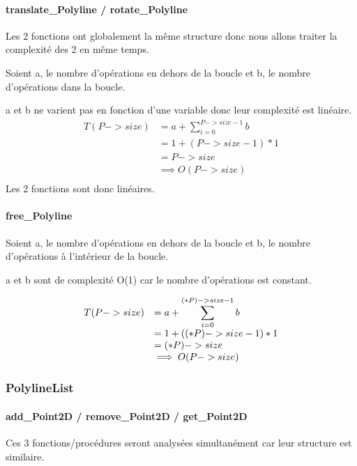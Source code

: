 \documentclass[a4paper, 11pt, oneside]{article}
\begin{document}
\paragraph{translate\_Polyline / rotate\_Polyline}

Les 2 fonctions ont globalement la même structure donc nous allons traiter la complexité des 2 en même temps.

Soient a, le nombre d'opérations en dehors de la boucle et b, le nombre d'opérations dans la boucle.

a et b ne varient pas en fonction d'une variable donc leur complexité est linéaire.
$$
\begin{array}{ll}
T(P->size) 
&= a + \displaystyle \sum_{i=0}^{P->size-1}b\\
&= 1 + (P->size-1)*1\\
&= P->size \\
&\implies O(P->size)\\
\end{array}
$$
Les 2 fonctions sont donc linéaires.

\paragraph{free\_Polyline}

Soient a, le nombre d'opérations en dehors de la boucle et b, le nombre d'opérations à l'intérieur de la boucle.

a et b sont de complexité O(1) car le nombre d'opérations est constant.

$$
\begin{array}{ll}
T(P->size) 
&= a + \displaystyle \sum_{i=0}^{(*P)->size-1}b \\
&= 1 + ((*P)->size-1)  * 1\\
&= (*P)->size\\
&\implies O(P->size)\\
\end{array}\\
$$
\subsubsection{PolylineList}

\paragraph{add\_Point2D / remove\_Point2D / get\_Point2D}

Ces 3 fonctions/procédures seront analysées simultanément car leur structure est similaire.
\end{document}
